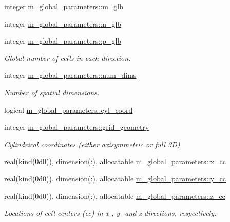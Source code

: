 \begin{DoxyCompactItemize}
integer \hyperlink{namespacem__global__parameters_ad4e160df8d0de7ea1801a1ca29f8e9b0}{m\+\_\+global\+\_\+parameters\+::m\+\_\+glb}
\item 
integer \hyperlink{namespacem__global__parameters_adab11dab474410541d4c37725bea01e1}{m\+\_\+global\+\_\+parameters\+::n\+\_\+glb}
\item 
integer \hyperlink{namespacem__global__parameters_a1072f221ca8e41b0ea3240b33374cc1e}{m\+\_\+global\+\_\+parameters\+::p\+\_\+glb}
\begin{DoxyCompactList}\small\item\em Global number of cells in each direction. \end{DoxyCompactList}\item 
integer \hyperlink{namespacem__global__parameters_a76e251296a28212df87bf9f653ff9a3b}{m\+\_\+global\+\_\+parameters\+::num\+\_\+dims}
\begin{DoxyCompactList}\small\item\em Number of spatial dimensions. \end{DoxyCompactList}\item 
logical \hyperlink{namespacem__global__parameters_a53f0d5eed7783c9760aaeeaa0abbd58c}{m\+\_\+global\+\_\+parameters\+::cyl\+\_\+coord}
\item 
integer \hyperlink{namespacem__global__parameters_a0f2d413d9739928f8e1a98f0a5783ab9}{m\+\_\+global\+\_\+parameters\+::grid\+\_\+geometry}
\begin{DoxyCompactList}\small\item\em Cylindrical coordinates (either axisymmetric or full 3D) \end{DoxyCompactList}\item 
real(kind(0d0)), dimension(\+:), allocatable \hyperlink{namespacem__global__parameters_aaf315f1df492ccc9daaeee046f185bb5}{m\+\_\+global\+\_\+parameters\+::x\+\_\+cc}
\item 
real(kind(0d0)), dimension(\+:), allocatable \hyperlink{namespacem__global__parameters_ad7e05d3d526e5dfa14a74ffda890e63d}{m\+\_\+global\+\_\+parameters\+::y\+\_\+cc}
\item 
real(kind(0d0)), dimension(\+:), allocatable \hyperlink{namespacem__global__parameters_a2c4b9e99b981dc55cccf0b153159404e}{m\+\_\+global\+\_\+parameters\+::z\+\_\+cc}
\begin{DoxyCompactList}\small\item\em Locations of cell-\/centers (cc) in x-\/, y-\/ and z-\/directions, respectively. \end{DoxyCompactList}\item 

\end{DoxyCompactItemize}
